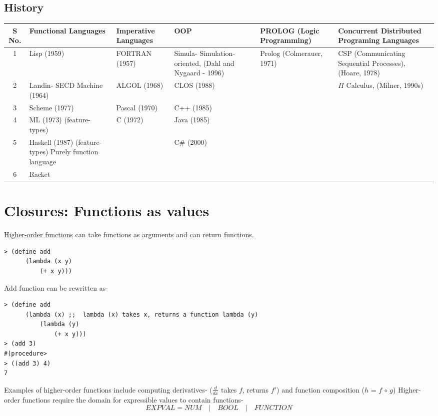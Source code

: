 \subsection{History}
\begin{table}[H]
  \begin{tabular}{|c|p{2.5cm}|p{2.5cm}|p{2.5cm}|p{2.5cm}|p{2.5cm}|}
    \hline
    \textbf{S No.} & \textbf{Functional Languages} & \textbf{Imperative Languages} & \textbf{OOP} & \textbf{PROLOG (Logic Programming)} & \textbf{Concurrent Distributed Programing Languages} \\
    \hline
    1 & Lisp (1959) & FORTRAN (1957) & Simula- Simulation-oriented, (Dahl and Nygaard - 1996) & Prolog (Colmerauer, 1971) & CSP (Communicating Sequential Processes), (Hoare, 1978) \\
    2 & Landin- SECD Machine (1964) & ALGOL (1968) & CLOS (1988) & & $\Pi$ Calculus, (Milner, 1990s) \\
    3 & Scheme (1977) & Pascal (1970) & C++ (1985) & & \\
    4 & ML (1973) (feature- types) & C (1972) & Java (1985) & & \\
    5 & Haskell (1987) (feature- types) Purely function language & & C\# (2000) & & \\
    6 & Racket & & & \\
    \hline
  \end{tabular}
\end{table}

\section{Closures: Functions as values}
\underline{Higher-order functions} can take functions as arguments and can return functions.

\begin{verbatim}
> (define add
      (lambda (x y)
          (+ x y)))
\end{verbatim}
Add function can be rewritten as-
\begin{verbatim}
> (define add
      (lambda (x) ;;  lambda (x) takes x, returns a function lambda (y)
          (lambda (y)
              (+ x y)))
> (add 3)          
#(procedure>
> ((add 3) 4)
7
\end{verbatim}

Examples of higher-order functions include computing derivatives- ($\frac{d}{dx}$ takes $f$, returns $f'$) and function composition ($h$ = $f$ $\circ$ $g$)\newline\newline
Higher-order functions require the domain for expressible values to contain functions-\newline
\[EXPVAL = NUM \quad | \quad BOOL \quad | \quad FUNCTION\]


